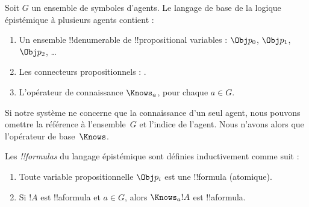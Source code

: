 \documentclass[../../../include/open-logic-section]{subfiles}
\begin{document}


\begin{defn}
Soit $G$ un ensemble de symboles d'agents. Le langage de base de la
logique épistémique à plusieurs agents contient :
\begin{enumerate}
  \item Un ensemble !!{denumerable} de !!{propositional variable}s : $\Obj
    p_0$, $\Obj p_1$, $\Obj p_2$, \dots
  \item Les connecteurs propositionnels : \startycommalist
  .
  \item L'opérateur de connaissance $\Knows_a$, pour chaque $a \in G$.
\end{enumerate}
\end{defn}

Si notre système ne concerne que la connaissance d'un seul agent, nous
pouvons omettre la référence à l'ensemble~$G$ et l'indice de l'agent.
Nous n'avons alors que l'opérateur de base~$\Knows$.

\begin{defn}
Les \emph{!!{formula}s} du langage épistémique sont définies
inductivement comme suit :
\begin{enumerate}


\item Toute variable propositionnelle $\Obj p_i$ est une !!{formula} (atomique).






\item Si $!A$ est !!a{formula} et $a \in G$, alors $\Knows_a !A$ est
  !!a{formula}.

\end{enumerate}
\end{defn}
\end{document}

